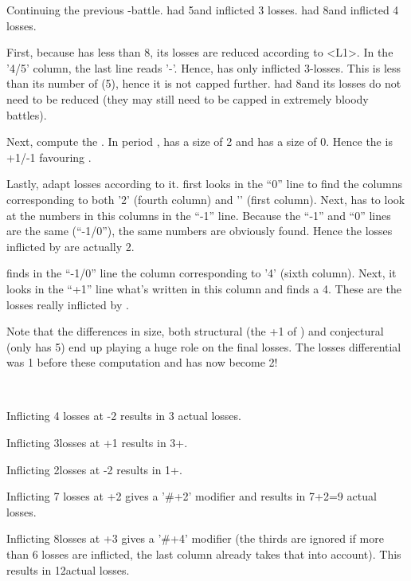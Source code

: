\begin{exemple}
  Continuing the previous \FRA-\HIS battle. \HIS had 5\LD and inflicted 3
  losses. \FRA had 8\LD and inflicted 4 losses.

  First, because \HIS has less than 8\LD, its losses are reduced according to
  <L1>. In the '4/5\LD' column, the last line reads '-\texttd'. Hence, \HIS
  has only inflicted 3-\texttu losses. This is less than its number
  of \LD (5), hence it is not capped further. \FRA had 8\LD and its losses do
  not need to be reduced (they may still need to be capped in extremely bloody
  battles).

  Next, compute the . In period , \FRA
  has a size of 2 and \HIS has a size of 0. Hence the  is +1/-1 favouring \FRA.

  Lastly, adapt losses according to it. \HIS first looks in the ``0'' line to
  find the columns corresponding to both '2' (fourth column) and '\texttu'
  (first column). Next, \HIS has to look at the numbers in this columns in the
  ``-1'' line. Because the ``-1'' and ``0'' lines are the same (``-1/0''), the
  same numbers are obviously found. Hence the losses inflicted by \HIS are
  actually 2\texttu.

  \FRA finds in the ``-1/0'' line the column corresponding to '4' (sixth
  column). Next, it looks in the ``+1'' line what's written in this column and
  finds a 4\texttd. These are the losses really inflicted by \FRA.

  Note that the differences in size, both structural (the +1 of \FRA) and
  conjectural (\HIS only has 5\LD) end up playing a huge role on the final
  losses. The losses differential was 1 before these computation and has now
  become 2\texttu!
\end{exemple}

\begin{exemple}~

  Inflicting 4 losses at -2 results in 3 actual losses.

  Inflicting 3\texttd losses at +1 results in 3\texttd+\texttu.

  Inflicting 2\texttd losses at -2 results in 1\texttu+\texttd.

  Inflicting 7 losses at +2 gives a '\#+2' modifier and results in 7+2=9
  actual losses.

  Inflicting 8\texttu losses at +3 gives a '\#+4' modifier (the thirds are
  ignored if more than 6 losses are inflicted, the last column already takes
  that into account). This results in 12\texttu actual losses.
\end{exemple}

